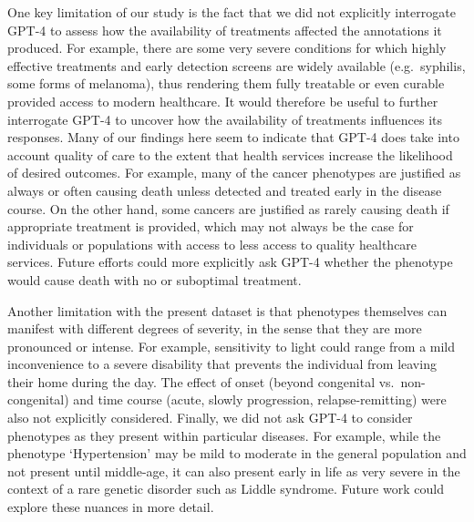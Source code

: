 \documentclass[
]{agujournal2019}
\begin{document}
One key limitation of our study is the fact that we did not explicitly
interrogate GPT-4 to assess how the availability of treatments affected
the annotations it produced. For example, there are some very severe
conditions for which highly effective treatments and early detection
screens are widely available (e.g.~syphilis, some forms of melanoma),
thus rendering them fully treatable or even curable provided access to
modern healthcare. It would therefore be useful to further interrogate
GPT-4 to uncover how the availability of treatments influences its
responses. Many of our findings here seem to indicate that GPT-4 does
take into account quality of care to the extent that health services
increase the likelihood of desired outcomes. For example, many of the
cancer phenotypes are justified as always or often causing death unless
detected and treated early in the disease course. On the other hand,
some cancers are justified as rarely causing death if appropriate
treatment is provided, which may not always be the case for individuals
or populations with access to less access to quality healthcare
services. Future efforts could more explicitly ask GPT-4 whether the
phenotype would cause death with no or suboptimal treatment.

Another limitation with the present dataset is that phenotypes
themselves can manifest with different degrees of severity, in the sense
that they are more pronounced or intense. For example, sensitivity to
light could range from a mild inconvenience to a severe disability that
prevents the individual from leaving their home during the day. The
effect of onset (beyond congenital vs.~non-congenital) and time course
(acute, slowly progression, relapse-remitting) were also not explicitly
considered. Finally, we did not ask GPT-4 to consider phenotypes as they
present within particular diseases. For example, while the phenotype
`Hypertension' may be mild to moderate in the general population and not
present until middle-age, it can also present early in life as very
severe in the context of a rare genetic disorder such as Liddle
syndrome. Future work could explore these nuances in more detail.
\end{document}
